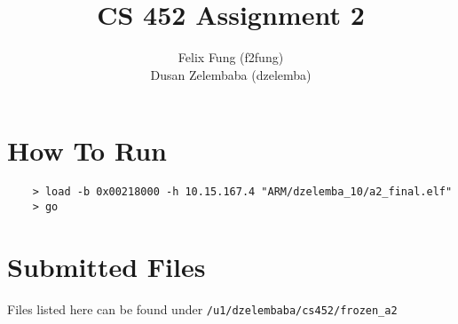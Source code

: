\documentclass[letterpaper]{article}
\begin{document}
\title{CS 452 Assignment 2}
\author{Felix Fung (f2fung) \\ Dusan Zelembaba (dzelemba)}
\maketitle

\section{How To Run}
\begin{verbatim}
	> load -b 0x00218000 -h 10.15.167.4 "ARM/dzelemba_10/a2_final.elf"
	> go
\end{verbatim}

\section{Submitted Files}

Files listed here can be found under \verb!/u1/dzelembaba/cs452/frozen_a2!
\end{document}
